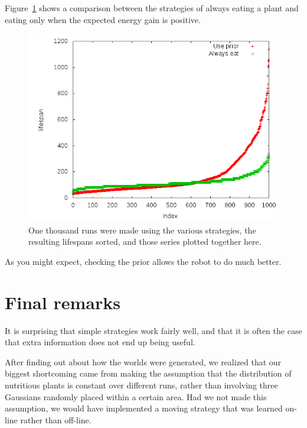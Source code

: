\documentclass{article}
\begin{document}
Figure~\ref{fig:comparison} shows a comparison between the strategies
of always eating a plant and eating only when the expected energy gain
is positive.

\begin{figure}
  \begin{center}
    \includegraphics[width=.8\columnwidth]{always_vs_prior.png}
  \end{center}
  \caption{One thousand runs were made using the various strategies,
    the resulting lifespans sorted, and those series plotted together
    here.}
  \label{fig:comparison}
\end{figure}

As you might expect, checking the prior allows the robot to do much
better.

\section{Final remarks}
It is surprising that simple strategies work fairly well, and that it
is often the case that extra information does not end up being useful.

After finding out about how the worlds were generated, we realized
that our biggest shortcoming came from making the assumption that the
distribution of nutritious plants is constant over different runs,
rather than involving three Gaussians randomly placed within a certain
area. Had we not made this assumption, we would have implemented a
moving strategy that was learned on-line rather than off-line.
\end{document}
